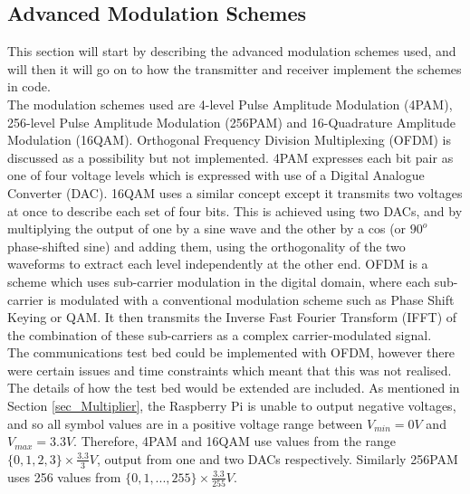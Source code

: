\documentclass[../main.tex]{subfiles}
\begin{document}
\subsection{Advanced Modulation Schemes} \label{sec_Advanced Modulation Schemes}

This section will start by describing the advanced modulation schemes used, and will then it will go on to how the transmitter and receiver implement  the schemes in code.\\

The modulation schemes used are 4-level Pulse Amplitude Modulation (4PAM), 256-level Pulse Amplitude Modulation (256PAM) and 16-Quadrature Amplitude Modulation (16QAM).
Orthogonal Frequency Division Multiplexing (OFDM) is discussed as a possibility but not implemented.
4PAM expresses each bit pair as one of four voltage levels which is expressed with use of a Digital Analogue Converter (DAC).
16QAM uses a similar concept except it transmits two voltages at once to describe each set of four bits.
This is achieved using two DACs, and by multiplying the output of one by a sine wave and the other by a cos (or $90^o$ phase-shifted sine) and adding them, using the orthogonality of the two waveforms to extract each level independently at the other end.
OFDM is a scheme which uses sub-carrier modulation in the digital domain, where each sub-carrier is modulated with a conventional modulation scheme such as Phase Shift Keying or QAM.
It then transmits the Inverse Fast Fourier Transform (IFFT) of the combination of these sub-carriers as a complex carrier-modulated signal.\\

The communications test bed could be implemented with OFDM, however there were certain issues and time constraints which meant that this was not realised.
The details of how the test bed would be extended are included.
As mentioned in Section \ref{sec_Multiplier}, the Raspberry Pi is unable to output negative voltages, and so all symbol values are in a positive voltage range between $V_{min} = 0V$ and $V_{max} = 3.3V$.
Therefore, 4PAM and 16QAM use values from the range $\{0, 1, 2, 3\} \times \frac{3.3}{3}V$, output from one and two DACs respectively.
Similarly 256PAM uses 256 values from $\{0, 1, ..., 255\} \times \frac{3.3}{255}V$.\\

\newpage
\end{document}

